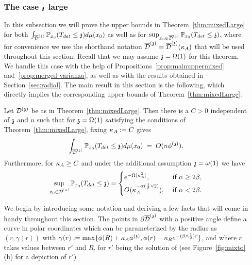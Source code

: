 \subsubsection{The case $\ss$ large}
%
 In this subsection we will prove the upper bounds in Theorem~\ref{thm:mixedLarge} for both $\int_{\ndt}\PP_{x_0}(T_{det}\leq \ss)d\mu(x_0)$ as well as for $\sup_{x_0\in\ndt}\PP_{x_0}(T_{det}\leq \ss)$, where for convenience we use the shorthand notation $\ndt=\ndt(\KA)$ that will be used throughout this section. Recall that we may assume $\ss=\Omega(1)$ for this theorem. We handle this case with the help of Propositions~\ref{prop:mainuppermixed} and~\ref{prop:merged-varianza}, as well as with the results obtained in Section~\ref{sec:radial}.
The main result in this section is the following, which directly implies the corresponding upper bounds of Theorem~\ref{thm:mixedLarge}:
\begin{proposition}\label{generalsgrande}
    Let $\dt$ be as in Theorem~\ref{thm:mixedLarge}. Then there is a $C>0$ independent of $\ss$ and $n$ such that for $\ss=\Omega(1)$ satisfying the conditions of Theorem~\ref{thm:mixedLarge}, fixing $\KA:=C$ gives  
\[\int_{\ndt}\P_{x_0}(T_{det}\leq \ss)d\mu(x_0) 
\;=\;O(n\phis).\]
Furthermore, for $\KA\geq C$ and under the additional assumption $\ss=\omega(1)$ we have
\[
\sup_{x_0\in\ndt}\P_{x_0}(T_{det}\leq \ss) =
\begin{cases}
e^{-\Omega(\KA^2)},
& \text{ if $\alpha\geq2\beta$,} \\[2pt]
O(\KA^{-\alpha(\frac{1}{\beta}\vee 2)}),
& \text{ if $\alpha<2\beta$.} 
\end{cases}
\]
\end{proposition}
We begin by introducing some notation and deriving a few facts that will come in handy throughout this section. The points in $\partial \ndt$ with a positive angle define a curve in polar coordinates which can be parameterized by the radius as $(r,\gamma(r))$ with $\gamma(r):=\max\{\phi(R)+\KA\phis,\phi(r)+\KR e^{-(\beta\wedge\frac12) r}\}$, and where $r$ takes values between $r'$ and $R$, for $r'$ being the solution of (see Figure~\ref{fig:mixto}(b) for a depiction of $r'$)
